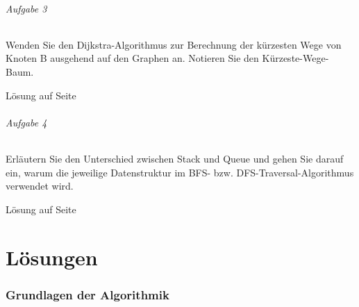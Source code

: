 \documentclass[11pt,a4paper]{scrartcl}
\begin{document}
\paragraph{Aufgabe 3} Wenden Sie den Dijkstra-Algorithmus zur Berechnung der kürzesten Wege von Knoten B ausgehend auf den Graphen an. Notieren Sie den Kürzeste-Wege-Baum.
\begin{flushright}
Lösung auf Seite \pageref{a6.3:lsg} \\
\end{flushright}
\paragraph{Aufgabe 4} Erläutern Sie den Unterschied zwischen Stack und Queue und gehen Sie darauf ein, warum die jeweilige Datenstruktur im BFS- bzw. DFS-Traversal-Algorithmus verwendet wird.
\begin{flushright}
Lösung auf Seite \pageref{a6.4:lsg} \\
\end{flushright}
\pagebreak
\part{Lösungen}
\section{Grundlagen der Algorithmik}
\end{document}
